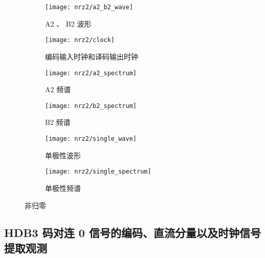 \documentclass[../main]{subfiles}
\begin{document}
\begin{figure}[htbp]
  \centering
  \begin{subfigure}[htbp]{0.45\linewidth}
    \centering
    \texttt{[image: nrz2/a2\_b2\_wave]}
    \caption{A2 、 B2 波形}%
    \label{fig:nrz2/a2_b2_wave}
  \end{subfigure}
  \quad
  \begin{subfigure}[htbp]{0.45\linewidth}
    \centering
    \texttt{[image: nrz2/clock]}
    \caption{编码输入时钟和译码输出时钟}%
    \label{fig:nrz2/clock}
  \end{subfigure}

  \begin{subfigure}[htbp]{0.45\linewidth}
    \centering
    \texttt{[image: nrz2/a2\_spectrum]}
    \caption{A2 频谱}%
    \label{fig:nrz2/a2_spectrum}
  \end{subfigure}
  \quad
  \begin{subfigure}[htbp]{0.45\linewidth}
    \centering
    \texttt{[image: nrz2/b2\_spectrum]}
    \caption{B2 频谱}%
    \label{fig:nrz2/b2_spectrum}
  \end{subfigure}

  \begin{subfigure}[htbp]{0.45\linewidth}
    \centering
    \texttt{[image: nrz2/single\_wave]}
    \caption{单极性波形}%
    \label{fig:nrz2/single_wave}
  \end{subfigure}
  \quad
  \begin{subfigure}[htbp]{0.45\linewidth}
    \centering
    \texttt{[image: nrz2/single\_spectrum]}
    \caption{单极性频谱}%
    \label{fig:nrz2/single_spectrum}
  \end{subfigure}
  \caption{非归零}%
  \label{fig:nrz2}
\end{figure}

\subsection{HDB3 码对连 0 信号的编码、直流分量以及时钟信号提取观测}%
\label{sub:0_dc_clock}


\end{document}
